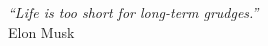 \cleardoublepage
\thispagestyle{plain}

\vspace*{8cm}

\begin{flushright}
   \textsl{``Life is too short for long-term grudges.''} \\
\vspace*{1.5cm}
           Elon Musk
\end{flushright}
